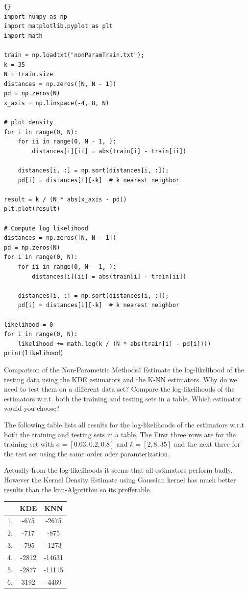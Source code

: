\begin{questions}
\begin{lstlisting}{}
import numpy as np
import matplotlib.pyplot as plt
import math

train = np.loadtxt("nonParamTrain.txt");
k = 35
N = train.size
distances = np.zeros([N, N - 1])
pd = np.zeros(N)
x_axis = np.linspace(-4, 8, N)

# plot density
for i in range(0, N):
    for ii in range(0, N - 1, ):
        distances[i][ii] = abs(train[i] - train[ii])

    distances[i, :] = np.sort(distances[i, :]);
    pd[i] = distances[i][-k]  # k nearest neighbor

result = k / (N * abs(x_axis - pd))
plt.plot(result)

# Compute log likelihood
distances = np.zeros([N, N - 1])
pd = np.zeros(N)
for i in range(0, N):
    for ii in range(0, N - 1, ):
        distances[i][ii] = abs(train[i] - train[ii])

    distances[i, :] = np.sort(distances[i, :]);
    pd[i] = distances[i][-k]  # k nearest neighbor

likelihood = 0
for i in range(0, N):
    likelihood += math.log(k / (N * abs(train[i] - pd[i])))
print(likelihood)
\end{lstlisting}


\begin{question}{Comparison of the Non-Parametric Methods}{4}
Estimate the log-likelihood of the testing data using the KDE estimators and the K-NN estimators.
Why do we need to test them on a different data set? Compare the log-likelihoods of the estimators w.r.t. both the training and testing sets in a table. Which estimator would you choose?

\begin{answer}
The following table lists all results for the log-likelihoods of the estimators w.r.t both the training and testing sets in a table. The First three rows are for the training set with $\sigma = [0.03, 0.2, 0.8]$ and $k = [2, 8, 35]$ and the next three for the test set using the same order oder paramterization.

Actually from the log-likelihoods it seems that all estimators perform badly. However the Kernel Density Estimate using Gaussian kernel has much better results than the knn-Algorithm so its prefferable.


\begin{center}
	\begin{tabular}{c| c | c  }
		& KDE & KNN \\
		\hline 
		1. & -675 & -2675 \\
		2. & -717 & -875 \\
		3. & -795 & -1273 \\
		\hline		
		4. & -2812 & -14631 \\
		5. & -2877 & -11115 \\
		6. & 3192 & -4469
	\end{tabular}
\end{center}


\end{answer}
\end{question}
\end{questions}

